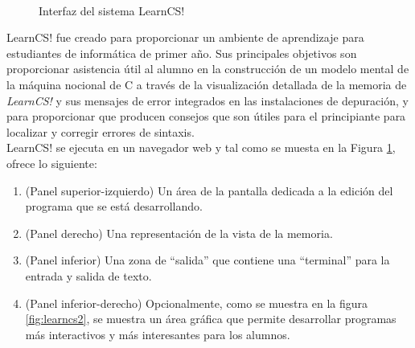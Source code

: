 \begin{figure}[!h]
  \centering
  \caption[LearnCS]{Interfaz del sistema LearnCS!}
  \\  
  \label{fig:learncs}
\end{figure}


LearnCS! fue creado para proporcionar un ambiente de aprendizaje para estudiantes de informática de primer año. Sus principales objetivos son proporcionar asistencia útil al alumno en la construcción de un modelo mental de la máquina nocional de C a través de la visualización detallada de la memoria de \emph{LearnCS!} y sus mensajes de error integrados en las instalaciones de depuración, y para proporcionar que producen consejos que son útiles para el principiante para localizar y corregir errores de sintaxis\cite{lipman_learncs_2014}.\\

LearnCS! se ejecuta en un navegador web y tal como se muesta en la Figura \ref{fig:learncs}, ofrece lo siguiente:

\begin{enumerate}
  \item (Panel superior-izquierdo) Un área de la pantalla dedicada a la edición del programa que se está desarrollando.
  \item (Panel derecho) Una representación de la vista de la memoria.
  \item (Panel inferior) Una zona de ``salida'' que contiene una ``terminal'' para la entrada y salida de texto.
  \item (Panel inferior-derecho) Opcionalmente, como se muestra en la figura \ref{fig:learncs2}, se muestra un área gráfica que permite desarrollar programas más interactivos y más interesantes para los alumnos.
\end{enumerate}

